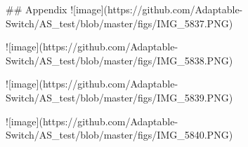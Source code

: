 ## Appendix
![image](https://github.com/Adaptable-Switch/AS_test/blob/master/figs/IMG_5837.PNG)

![image](https://github.com/Adaptable-Switch/AS_test/blob/master/figs/IMG_5838.PNG)

![image](https://github.com/Adaptable-Switch/AS_test/blob/master/figs/IMG_5839.PNG)

![image](https://github.com/Adaptable-Switch/AS_test/blob/master/figs/IMG_5840.PNG)
